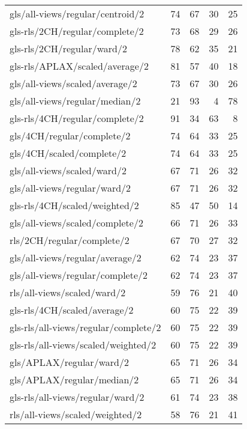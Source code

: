 \begin{longtable}{lrrrr}
    gls/all-views/regular/centroid/2          & 74 & 67 & 30 & 25 \\
    gls-rls/2CH/regular/complete/2            & 73 & 68 & 29 & 26 \\
    gls-rls/2CH/regular/ward/2                & 78 & 62 & 35 & 21 \\
    gls-rls/APLAX/scaled/average/2            & 81 & 57 & 40 & 18 \\
    gls/all-views/scaled/average/2            & 73 & 67 & 30 & 26 \\
    gls/all-views/regular/median/2            & 21 & 93 &  4 & 78 \\
    gls-rls/4CH/regular/complete/2            & 91 & 34 & 63 &  8 \\
    gls/4CH/regular/complete/2                & 74 & 64 & 33 & 25 \\
    gls/4CH/scaled/complete/2                 & 74 & 64 & 33 & 25 \\
    gls/all-views/scaled/ward/2               & 67 & 71 & 26 & 32 \\
    gls/all-views/regular/ward/2              & 67 & 71 & 26 & 32 \\
    gls-rls/4CH/scaled/weighted/2             & 85 & 47 & 50 & 14 \\
    gls/all-views/scaled/complete/2           & 66 & 71 & 26 & 33 \\
    rls/2CH/regular/complete/2                & 67 & 70 & 27 & 32 \\
    gls/all-views/regular/average/2           & 62 & 74 & 23 & 37 \\
    gls/all-views/regular/complete/2          & 62 & 74 & 23 & 37 \\
    rls/all-views/scaled/ward/2               & 59 & 76 & 21 & 40 \\
    gls-rls/4CH/scaled/average/2              & 60 & 75 & 22 & 39 \\
    gls-rls/all-views/regular/complete/2      & 60 & 75 & 22 & 39 \\
    gls-rls/all-views/scaled/weighted/2       & 60 & 75 & 22 & 39 \\
    gls/APLAX/regular/ward/2                  & 65 & 71 & 26 & 34 \\
    gls/APLAX/regular/median/2                & 65 & 71 & 26 & 34 \\
    gls-rls/all-views/regular/ward/2          & 61 & 74 & 23 & 38 \\
    rls/all-views/scaled/weighted/2           & 58 & 76 & 21 & 41 \\

\end{longtable}
